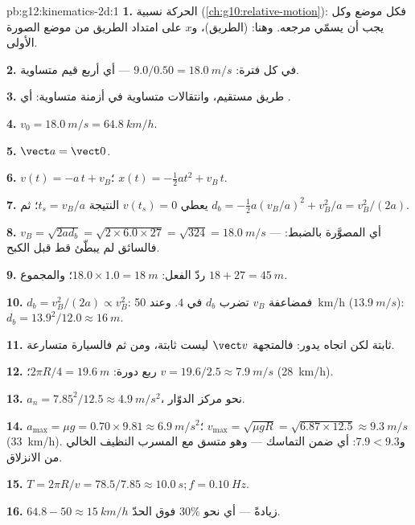 \begin{solution}{pb:g12:kinematics-2d:1}
\textbf{1.} الحركة نسبية (\cref{ch:g10:relative-motion}): فكل
موضع وكل  يجب أن يسمّي مرجعه. وهنا: 
(الطريق)، و$x$ على امتداد الطريق من موضع الصورة الأولى.

\textbf{2.} في كل فترة: $9.0/0.50 = \qty{18.0}{m/s}$ --- أي أربع
قيم متساوية.

\textbf{3.} طريق مستقيم، وانتقالات متساوية في أزمنة متساوية:
أي .

\textbf{4.} $v_0 = \qty{18.0}{m/s} = \qty{64.8}{km/h}$.

\textbf{5.} $\vect a = \vect 0$.

\textbf{6.} $v(t) = -a\,t + v_B$؛ $x(t) = -\tfrac12 a t^2 + v_B\,t$.

\textbf{7.} يعطي $v(t_s) = 0$ النتيجة $t_s = v_B/a$؛ ثم
$d_b = -\tfrac12 a (v_B/a)^2 + v_B^2/a = v_B^2/(2a)$.

\textbf{8.} $v_B = \sqrt{2 a d_b} = \sqrt{2 \times 6.0 \times 27} =
\sqrt{324} = \qty{18.0}{m/s}$ --- أي  المصوَّرة بالضبط: فالسائق
لم يبطّئ قط قبل الكبح.

\textbf{9.} ردّ الفعل: $18.0 \times 1.0 = \qty{18}{m}$؛ والمجموع
$18 + 27 = \qty{45}{m}$.

\textbf{10.} $d_b = v_B^2/(2a) \propto v_B^2$: فمضاعفة $v_B$
تضرب $d_b$ في $4$. وعند \qty{50}{km/h} ($\qty{13.9}{m/s}$):
$d_b = 13.9^2/12.0 \approx \qty{16}{m}$.

\textbf{11.}  ثابتة لكن اتجاه  يدور:
فالمتجهة $\vect v$ ليست ثابتة، ومن ثم فالسيارة متسارعة.

\textbf{12.} ربع دورة: $2\pi R/4 = \qty{19.6}{m}$؛
$v = 19.6/2.5 \approx \qty{7.9}{m/s}$ (\qty{28}{km/h}).

\textbf{13.} $a_n = 7.85^2/12.5 \approx \qty{4.9}{m/s^2}$، نحو مركز
الدوّار.

\textbf{14.} $a_{\max} = \mu g = 0.70 \times 9.81 \approx
\qty{6.9}{m/s^2}$؛ $v_{\max} = \sqrt{\mu g R} =
\sqrt{6.87 \times 12.5} \approx \qty{9.3}{m/s}$ (\qty{33}{km/h}).
و$7.9 < 9.3$: أي ضمن التماسك --- وهو متسق مع المسرب النظيف الخالي من
الانزلاق.

\textbf{15.} $T = 2\pi R/v = 78.5/7.85 \approx \qty{10.0}{s};
f = \qty{0.10}{Hz}$.

\textbf{16.} $64.8 - 50 \approx \qty{15}{km/h}$ زيادةً --- أي نحو
$30\%$ فوق الحدّ.


\end{solution}
